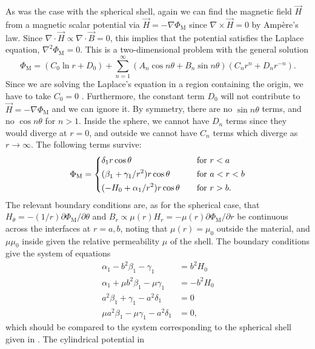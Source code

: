As was the case with the spherical shell, again we can find the magnetic field
$\vec H$ from a magnetic scalar potential via $\vec H=-\nabla\Phi_\text{M}$
since $\nabla\times\vec H=0$ by Amp\`ere's law. Since
$\nabla\cdot\vec H\propto\nabla\cdot\vec B=0$, this implies that the potential
satisfies the Laplace equation, $\nabla^2\Phi_\text{M}=0$. This is a
two-dimensional problem with the general solution
\cite[eqn~21.31]{riley2006mathematical}
%
\[
   \Phi_\text{M}=(C_0\ln r+D_0)+\sum_{n=1}^{\infty}(A_n\cos
   n\theta+B_n\sin n\theta)(C_nr^n+D_nr^{-n}).
\]
%
Since we are solving the Laplace's equation in a region containing the origin,
we have to take $C_0=0$ \cite[sect~21.3.1]{riley2006mathematical}. Furthermore,
the constant term $D_0$ will not contribute to $\vec H=-\nabla\Phi_\text{M}$
and we can ignore it. By symmetry, there are no $\sin n\theta$ terms, and no $\cos
n\theta$ for $n>1$. Inside the sphere, we cannot have $D_n$ terms since they would
diverge at $r=0$, and outside we cannot have $C_n$ terms which diverge as
$r\to\infty$. The following terms survive:
%
\begin{align}
   \label{cylindrical_potential}
   \Phi_\text{M}=
    \begin{dcases*}
       \delta_1r\cos\theta&\quad for $r<a$\\
       (\beta_1+\gamma_1/r^2)r\cos\theta&\quad for $a<r<b$\\
       (-H_0+\alpha_1/r^2)r\cos\theta&\quad for $r>b$.
    \end{dcases*}
\end{align}
%
The relevant boundary conditions are, as for the spherical case, that
$H_\theta=-(1/r)\partial\Phi_\text{M}/\partial\theta$ and
$B_r\propto\mu(r)H_r=-\mu(r)\partial\Phi_\text{M}/\partial r$ be continuous
across the interfaces at $r=a,b$, noting that $\mu(r)=\mu_0$ outside the
material, and $\mu\mu_0$ inside given the relative permeability $\mu$ of the
shell. The boundary conditions give the system of equations
%
\begin{align}
   \label{cyl_system}
   \alpha_1-b^2\beta_1-\gamma_1&=b^2H_0\\
   \alpha_1+\mu b^2\beta_1-\mu\gamma_1&=-b^2H_0\\
   a^2\beta_1+\gamma_1-a^2\delta_1&=0\\
   \mu a^2\beta_1-\mu\gamma_1-a^2\delta_1&=0,
\end{align}
%
which should be compared to the system corresponding to the spherical shell
given in \cite[eqn~5.120]{jackson1998classical}. The cylindrical potential in
